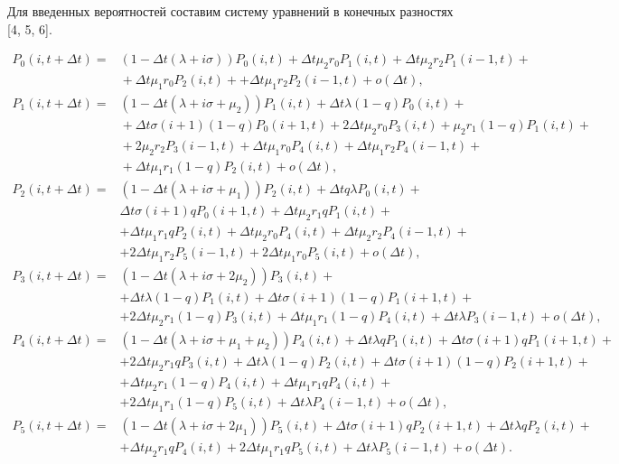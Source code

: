 Для введенных вероятностей составим систему уравнений в конечных разностях [4, 5, 6]. 
\begin{adjustwidth}{0pt}{0pt}
	\begin{align*} 
		P_{0}(i,t+\Delta t)=&(1-\Delta t(\lambda+i\sigma))P_{0}(i,t)+\Delta t\mu_{2}r_{0}P_{1}(i,t)+\Delta t\mu_{2}r_{2}P_{1}(i-1,t)+\\
		&{}+\Delta t\mu_{1}r_{0}P_{2}(i,t)+
		+\Delta t\mu_{1}r_{2}P_{2}(i-1,t)+o(\Delta t),\\
		P_{1}(i,t+\Delta t)=&(1-\Delta t(\lambda+i\sigma+\mu_{2}))P_{1}(i,t)+\Delta t\lambda(1-q)P_{0}(i,t)+\\
		&{}+\Delta t\sigma(i+1)(1-q)P_{0}(i+1,t)+2\Delta t\mu_{2}r_{0}P_{3}(i,t) + \mu_{2}r_{1}(1-q)P_{1}(i,t)+\\
		&{}+2\mu_{2}r_{2}P_{3}(i-1,t)+\Delta t\mu_{1}r_{0}P_{4}(i,t)+
		\Delta t\mu_{1}r_{2}P_{4}(i-1,t)+\\
		&{}+\Delta t\mu_{1}r_{1}(1-q)P_{2}(i,t)+o(\Delta t),\\
		P_{2}(i,t+\Delta t)=&(1-\Delta t(\lambda+i\sigma+\mu_{1}))P_{2}(i,t)+\Delta tq\lambda P_{0}(i,t)+\\
		&\Delta t\sigma(i+1)qP_{0}(i+1,t)+\Delta t\mu_{2}r_{1}qP_{1}(i,t)+\\
		&+\Delta t\mu_{1}r_{1}qP_{2}(i,t)+\Delta t\mu_{2}r_{0}P_{4}(i,t)+\Delta t\mu_{2}r_{2}P_{4}(i-1,t)+\\
		&+2\Delta t\mu_{1}r_{2}P_{5}(i-1,t)+2\Delta t\mu_{1}r_{0}P_{5}(i,t)+o(\Delta t),\\
		P_{3}(i,t+\Delta t)=&(1-\Delta t(\lambda+i\sigma+2\mu_{2}))P_{3}(i,t)+\\
		&+\Delta t\lambda(1-q)P_{1}(i,t)+\Delta t\sigma(i+1)(1-q)P_{1}(i+1,t)+\\
		&+2\Delta t\mu_{2}r_{1}(1-q)P_{3}(i,t)+\Delta t\mu_{1}r_{1}(1-q)P_{4}(i,t)+\Delta t\lambda P_{3}(i-1,t)+o(\Delta t),\\
		P_{4}(i,t+\Delta t)=&(1-\Delta t(\lambda+i\sigma+\mu_{1}+\mu_{2}))P_{4}(i,t)+\Delta t\lambda qP_{1}(i,t)+\Delta t\sigma(i+1)qP_{1}(i+1,t)+\\
		&+2\Delta t\mu_{2}r_{1}qP_{3}(i,t)+\Delta t\lambda(1-q)P_{2}(i,t)+\Delta t\sigma(i+1)(1-q)P_{2}(i+1,t)+\\
		&+\Delta t\mu_{2}r_{1}(1-q)P_{4}(i,t)+\Delta t\mu_{1}r_{1}qP_{4}(i,t)+\\
		&+2\Delta t\mu_{1}r_{1}(1-q)P_{5}(i,t)+\Delta t\lambda P_{4}(i-1,t)+o(\Delta t),\\
		P_{5}(i,t+\Delta t)=&(1-\Delta t(\lambda+i\sigma+2\mu_{1}))P_{5}(i,t)+\Delta t\sigma(i+1)qP_{2}(i+1,t)+\Delta t\lambda qP_{2}(i,t)+\\
		&+\Delta t\mu_{2}r_{1}qP_{4}(i,t)+2\Delta t\mu_{1}r_{1}qP_{5}(i,t)+\Delta t\lambda P_{5}(i-1,t)+o(\Delta t).
	\end{align*}
\end{adjustwidth}
